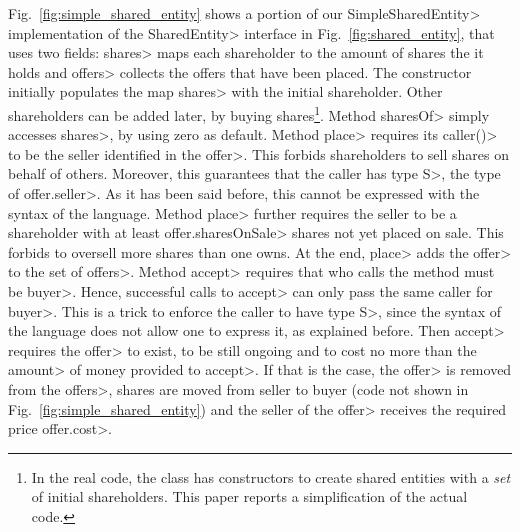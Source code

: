 Fig.~\ref{fig:simple_shared_entity} shows a portion of our \<SimpleSharedEntity>
implementation of the \<SharedEntity> interface in Fig.~\ref{fig:shared_entity}, that
uses two fields: \<shares> maps each shareholder to the amount of shares the it holds and
\<offers> collects the offers that have been placed.
The constructor initially populates the map \<shares> with the initial shareholder.
Other shareholders can be added later, by buying shares\footnote{In the real code, the class has
  constructors to create shared entities with a \emph{set} of initial shareholders. This paper
  reports a simplification of the actual code.}.
Method \<sharesOf> simply accesses
\<shares>, by using zero as default. Method \<place> requires its \<caller()> to be
the seller identified in the \<offer>. This forbids shareholders to sell shares on behalf of others.
Moreover, this guarantees that the caller has type \<S>, the type of \<offer.seller>.
As it has been said before, this cannot be expressed with the syntax of the language.
Method \<place> further requires the seller to be a shareholder with at least \<offer.sharesOnSale>
shares not yet placed on sale. This forbids to oversell more shares
than one owns. At the end, \<place> adds the \<offer> to the set of \<offers>.
Method \<accept> requires that who calls the method must be \<buyer>. Hence, successful
calls to \<accept> can only pass the same caller for \<buyer>. This is a trick to enforce the
caller to have type \<S>, since the syntax of the language does not allow one to express it,
as explained before. Then \<accept> requires the \<offer> to exist, to be still ongoing
and to cost no more than the \<amount> of money provided to \<accept>. If that is the case,
the \<offer> is removed from the \<offers>, shares are moved from seller to buyer (code not
shown in Fig.~\ref{fig:simple_shared_entity}) and the seller of the \<offer>
receives the required price \<offer.cost>.
